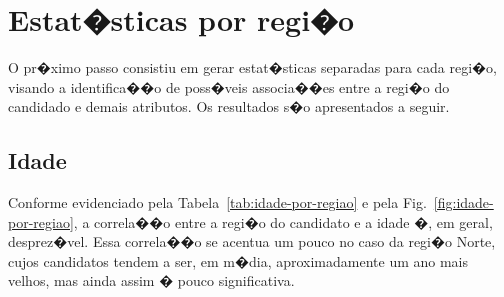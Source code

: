 \documentclass[12pt]{article}
\newcommand{\reffig}[1]{Fig.~\ref{fig:#1}}
\newcommand{\reftab}[1]{Tabela~\ref{tab:#1}}
\begin{document}
\section{Estat�sticas por regi�o}
O pr�ximo passo consistiu em gerar estat�sticas separadas para cada regi�o, visando a identifica��o de poss�veis associa��es entre a regi�o do candidado e demais atributos.
Os resultados s�o apresentados a seguir.

\subsection{Idade}
Conforme evidenciado pela \reftab{idade-por-regiao} e pela \reffig{idade-por-regiao}, a correla��o entre a regi�o do candidato e a idade �, em geral, desprez�vel. Essa correla��o se acentua um pouco no caso da regi�o Norte, cujos candidatos tendem a ser, em m�dia, aproximadamente um ano mais velhos, mas ainda assim � pouco significativa.
\end{document}
